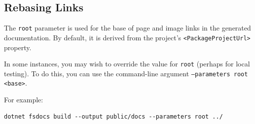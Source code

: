 \documentclass{article}
\begin{document}
\subsection*{Rebasing Links}



The \texttt{root} parameter is used for the base of page and image links in the generated documentation. By default, it is derived from the project's \texttt{<PackageProjectUrl>} property.


In some instances, you may wish to override the value for \texttt{root} (perhaps for local testing). To do this, you can use the command-line argument \texttt{--parameters root <base>}.


For example:
\begin{lstlisting}
dotnet fsdocs build --output public/docs --parameters root ../

\end{lstlisting}
\end{document}
